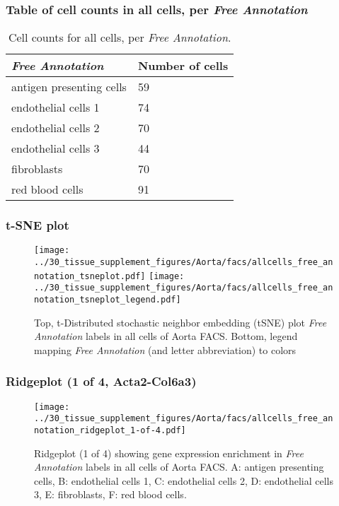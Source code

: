 \subsubsection{Table of cell counts in all cells, per \emph{Free Annotation}}\begin{table}[h]
\centering
\label{my-label}
\begin{tabular}{@{}ll@{}}
\toprule

\emph{Free Annotation}& Number of cells \\ \midrule
antigen presenting cells & 59 \\

endothelial cells 1 & 74 \\

endothelial cells 2 & 70 \\

endothelial cells 3 & 44 \\

fibroblasts & 70 \\

red blood cells & 91 \\
\bottomrule
\end{tabular}
\caption{Cell counts for all cells, per \emph{Free Annotation}.}
\end{table}

\clearpage
\subsubsection{t-SNE plot}
\begin{figure}[h]
\centering
\texttt{[image: ../30\_tissue\_supplement\_figures/Aorta/facs/allcells\_free\_annotation\_tsneplot.pdf]}
\texttt{[image: ../30\_tissue\_supplement\_figures/Aorta/facs/allcells\_free\_annotation\_tsneplot\_legend.pdf]}
\caption{Top, t-Distributed stochastic neighbor embedding (tSNE) plot  \emph{Free Annotation} labels in all cells of Aorta FACS. Bottom, legend mapping \emph{Free Annotation} (and letter abbreviation) to colors}
\end{figure}


\clearpage

\subsubsection{Ridgeplot (1 of 4, Acta2-Col6a3)}
\begin{figure}[h]
\centering
\texttt{[image: ../30\_tissue\_supplement\_figures/Aorta/facs/allcells\_free\_annotation\_ridgeplot\_1-of-4.pdf]}

\caption{ Ridgeplot (1 of 4)  showing gene expression enrichment in \emph{Free Annotation} labels in all cells of Aorta FACS. A: antigen presenting cells, B: endothelial cells 1, C: endothelial cells 2, D: endothelial cells 3, E: fibroblasts, F: red blood cells.}
\end{figure}


